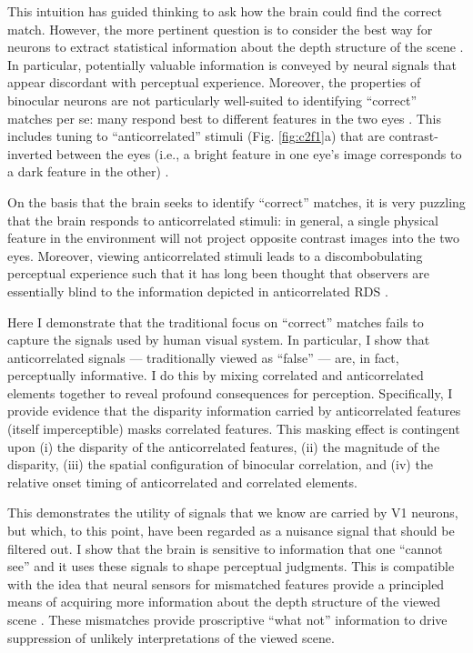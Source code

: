 This intuition has guided thinking to ask how the brain could find the correct match. However, the more pertinent question is to consider the best way for neurons to extract statistical information about the depth structure of the scene \cite{Goncalves:2017aa}. In particular, potentially valuable information is conveyed by neural signals that appear discordant with perceptual experience. Moreover, the properties of binocular neurons are not particularly well-suited to identifying ``correct'' matches per se: many respond best to different features in the two eyes \cite{DeAngelis:1991mb,Prince:2002uq,Tsao:2003pi}. This includes tuning to ``anticorrelated'' stimuli (Fig. \ref{fig:c2f1}a) that are contrast-inverted between the eyes (i.e., a bright feature in one eye's image corresponds to a dark feature in the other) \cite{Ohzawa:1990cq,Cumming:1997ve}.

On the basis that the brain seeks to identify ``correct'' matches, it is very puzzling that the brain responds to anticorrelated stimuli: in general, a single physical feature in the environment will not project opposite contrast images into the two eyes. Moreover, viewing anticorrelated stimuli leads to a discombobulating perceptual experience such that it has long been thought that observers are essentially blind to the information depicted in anticorrelated RDS \cite{BLTJ:BLTJ3954,Cogan:1993yr,Cumming:1998ib,Read:2000kx,Hibbard2014}.

Here I demonstrate that the traditional focus on ``correct'' matches fails to capture the signals used by human visual system. In particular, I show that anticorrelated signals --- traditionally viewed as ``false'' --- are, in fact, perceptually informative. I do this by mixing correlated and anticorrelated elements together to reveal profound consequences for perception. Specifically, I provide evidence that the disparity information carried by anticorrelated features (itself imperceptible) masks correlated features. This masking effect is contingent upon (i) the disparity of the anticorrelated features, (ii) the magnitude of the disparity, (iii) the spatial configuration of binocular correlation, and (iv) the relative onset timing of anticorrelated and correlated elements.

This demonstrates the utility of signals that we know are carried by V1 neurons, but which, to this point, have been regarded as a nuisance signal that should be filtered out. I show that the brain is sensitive to information that one ``cannot see'' and it uses these signals to shape perceptual judgments. This is compatible with the idea that neural sensors for mismatched features provide a principled means of acquiring more information about the depth structure of the viewed scene \cite{Goncalves:2017aa}. These mismatches provide proscriptive ``what not'' information to drive suppression of unlikely interpretations of the viewed scene.


